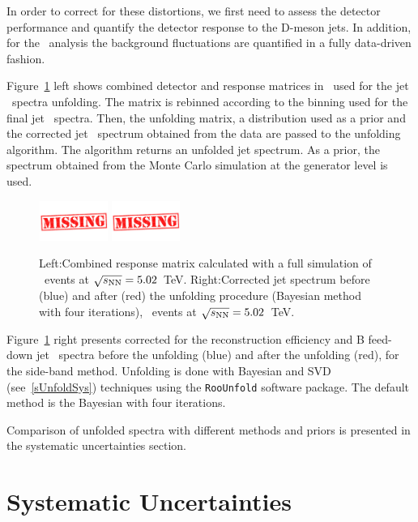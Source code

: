 In order to correct for these distortions, we first need to assess the detector performance and quantify
the detector response to the D-meson jets. In addition, for the \pPb\ analysis the background fluctuations are quantified in a
fully data-driven fashion.

Figure~\ref{fUnfSpec_pPb} left shows combined detector and response matrices in \pPb\, used for the jet \pt\ spectra unfolding.
The matrix is rebinned according to the binning used for the final jet \pt\ spectra. Then, the unfolding matrix, a distribution used as a prior and the corrected jet \pt\ spectrum obtained from the data are passed to the unfolding algorithm. The algorithm returns an unfolded jet \pt spectrum. As a prior, the spectrum obtained from the Monte Carlo simulation at the generator level is used.

\begin{figure}[bth]
\centering
\includegraphics[width=0.2\textwidth]{missing}
\includegraphics[width=0.2\textwidth]{missing}
\caption{Left:Combined response matrix calculated with a full simulation of \pPb\ events at $\sqrt{s_{\rm NN}}=5.02$~TeV.
Right:Corrected jet \pt spectrum before (blue) and after (red) the unfolding procedure (Bayesian method with four iterations), \pPb\ events at $\sqrt{s_{\rm NN}}=5.02$~TeV.}
\label{fUnfSpec_pPb}
\end{figure}

Figure~\ref{fUnfSpec_pPb} right presents corrected for the reconstruction efficiency and B feed-down jet \pt\ spectra before the unfolding (blue) and after the unfolding (red), for the side-band method.
Unfolding is done with Bayesian and SVD (see~\ref{sUnfoldSys}) techniques using the \texttt{RooUnfold} software package. The default method is the Bayesian with four iterations.

Comparison of unfolded spectra with different methods and priors is presented in the systematic uncertainties section. 

\section{Systematic Uncertainties}

